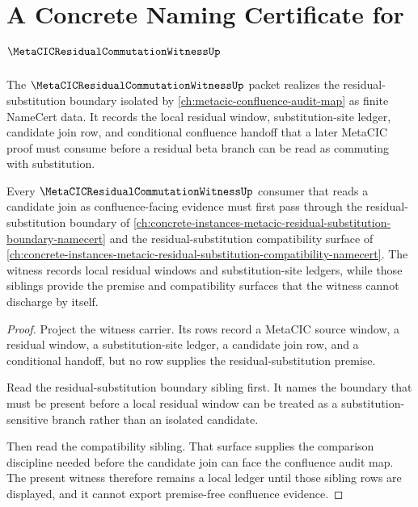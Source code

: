 \chapter{A Concrete Naming Certificate for $\MetaCICResidualCommutationWitnessUp$}
\label{ch:concrete-instances-metacic-residual-commutation-witness-namecert}

The $\MetaCICResidualCommutationWitnessUp$ packet realizes the residual-substitution boundary isolated by \autoref{ch:metacic-confluence-audit-map} as finite NameCert data. It records the local residual window, substitution-site ledger, candidate join row, and conditional confluence handoff that a later MetaCIC proof must consume before a residual beta branch can be read as commuting with substitution.

\begin{theorem}
\label{thm:metacic-residual-commutation-witness-sibling-route}
Every $\MetaCICResidualCommutationWitnessUp$ consumer that reads a candidate join as confluence-facing evidence must first pass through the residual-substitution boundary of \autoref{ch:concrete-instances-metacic-residual-substitution-boundary-namecert} and the residual-substitution compatibility surface of \autoref{ch:concrete-instances-metacic-residual-substitution-compatibility-namecert}. The witness records local residual windows and substitution-site ledgers, while those siblings provide the premise and compatibility surfaces that the witness cannot discharge by itself.
\end{theorem}
\begin{proof}
Project the witness carrier. Its rows record a MetaCIC source window, a residual window, a substitution-site ledger, a candidate join row, and a conditional handoff, but no row supplies the residual-substitution premise.

Read the residual-substitution boundary sibling first. It names the boundary that must be present before a local residual window can be treated as a substitution-sensitive branch rather than an isolated candidate.

Then read the compatibility sibling. That surface supplies the comparison discipline needed before the candidate join can face the confluence audit map. The present witness therefore remains a local ledger until those sibling rows are displayed, and it cannot export premise-free confluence evidence.
\end{proof}

